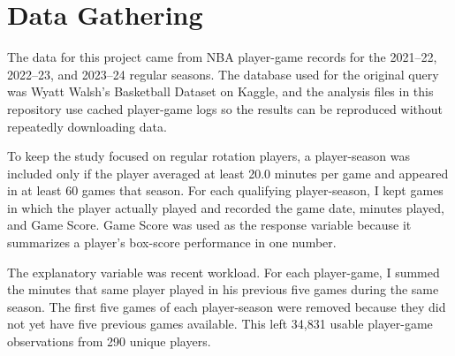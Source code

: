 \section{Data Gathering}

The data for this project came from NBA player-game records for the 2021--22, 2022--23, and 2023--24 regular seasons. The database used for the original query was Wyatt Walsh's Basketball Dataset on Kaggle, and the analysis files in this repository use cached player-game logs so the results can be reproduced without repeatedly downloading data.

To keep the study focused on regular rotation players, a player-season was included only if the player averaged at least 20.0 minutes per game and appeared in at least 60 games that season. For each qualifying player-season, I kept games in which the player actually played and recorded the game date, minutes played, and Game Score. Game Score was used as the response variable because it summarizes a player's box-score performance in one number.

The explanatory variable was recent workload. For each player-game, I summed the minutes that same player played in his previous five games during the same season. The first five games of each player-season were removed because they did not yet have five previous games available. This left 34,831 usable player-game observations from 290 unique players.

\begin{table}[htbp]
\centering
\caption{Sample of raw player-game records used to build the workload data set.}
\label{tab:raw-data-sample}
\end{table}
